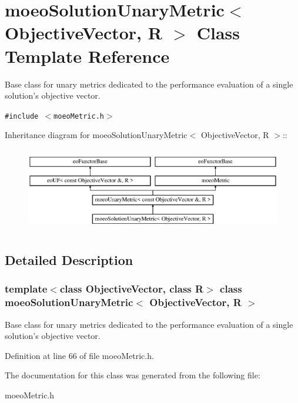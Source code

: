 \section{moeo\-Solution\-Unary\-Metric$<$ Objective\-Vector, R $>$ Class Template Reference}
\label{classmoeoSolutionUnaryMetric}
Base class for unary metrics dedicated to the performance evaluation of a single solution's objective vector.  


{\tt \#include $<$moeo\-Metric.h$>$}

Inheritance diagram for moeo\-Solution\-Unary\-Metric$<$ Objective\-Vector, R $>$::\begin{figure}[H]
\begin{center}
\leavevmode
\includegraphics[height=3.70861cm]{classmoeoSolutionUnaryMetric}
\end{center}
\end{figure}


\subsection{Detailed Description}
\subsubsection*{template$<$class Objective\-Vector, class R$>$ class moeo\-Solution\-Unary\-Metric$<$ Objective\-Vector, R $>$}

Base class for unary metrics dedicated to the performance evaluation of a single solution's objective vector. 



Definition at line 66 of file moeo\-Metric.h.

The documentation for this class was generated from the following file:\begin{CompactItemize}
\item 
moeo\-Metric.h\end{CompactItemize}
